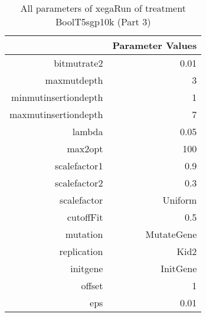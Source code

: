 \begin{table}[ht]
\centering
\begin{tabular}{rr}
  \hline
 & Parameter Values \\ 
  \hline
bitmutrate2 & 0.01 \\ 
  maxmutdepth & 3 \\ 
  minmutinsertiondepth & 1 \\ 
  maxmutinsertiondepth & 7 \\ 
  lambda & 0.05 \\ 
  max2opt & 100 \\ 
  scalefactor1 & 0.9 \\ 
  scalefactor2 & 0.3 \\ 
  scalefactor & Uniform \\ 
  cutoffFit & 0.5 \\ 
  mutation & MutateGene \\ 
  replication & Kid2 \\ 
  initgene & InitGene \\ 
  offset & 1 \\ 
  eps & 0.01 \\ 
   \hline
\end{tabular}
\caption{ All parameters of xegaRun of treatment BoolT5sgp10k 
 (Part 3)} 
\end{table}
